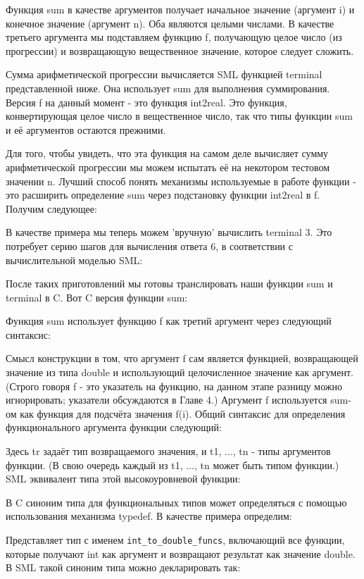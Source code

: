 Функция sum в качестве аргументов получает начальное значение (аргумент i) и конечное значение (аргумент n). Оба являются целыми числами. В качестве третьего аргумента мы подставляем функцию f, получающую целое число (из прогрессии) и возвращающую вещественное значение, которое следует сложить.

Сумма арифметической прогрессии вычисляется SML функцией terminal представленной ниже. Она использует sum для выполнения суммирования. Версия f на данный момент - это функция int2real. Это функция, конвертирующая целое число в вещественное число, так что типы функции sum и её аргументов остаются прежними.

Для того, чтобы увидеть, что эта функция на самом деле вычисляет сумму арифметической прогрессии мы можем испытать её на некотором тестовом значении n. Лучший способ понять механизмы используемые в работе функции - это расширить определение sum через подстановку функции int2real в f. Получим следующее:

В качестве примера мы теперь можем 'вручную' вычислить terminal 3. Это потребует серию шагов для вычисления ответа 6, в соответствии с вычислительной моделью SML:

После таких приготовлений мы готовы транслировать наши функции sum и terminal в C. Вот C версия функции sum:

Функция sum использует функцию f как третий аргумент через следующий синтаксис:

Смысл конструкции в том, что аргумент f сам является функцией, возвращающей значение из типа double и использующий целочисленное значение как аргумент. (Строго говоря f - это указатель на функцию, на данном этапе разницу можно игнорировать; указатели обсуждаются в Главе 4.) Аргумент f используется sum-ом как функция для подсчёта значения f(i). Общий синтаксис для определения функционального аргумента функции следующий:

Здесь tr задаёт тип возвращаемого значения, и t1, ..., tn - типы аргументов функции. (В свою очередь каждый из t1, ..., tn может быть типом функции.) SML эквивалент типа этой высокоуровневой функции:

В C синоним типа для функциональных типов может определяться с помощью использования механизма typedef. В качестве примера определим:

Представляет тип с именем \lstinline|int_to_double_funcs|, включающий все функции, которые получают int как аргумент и возвращают результат как значение double. В SML такой синоним типа можно декларировать так:

